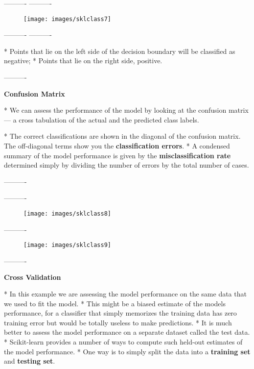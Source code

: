 ----------%
\newpage
----------%
\begin{figure}[h!]
\centering
\texttt{[image: images/sklclass7]}

\end{figure}

----------%
----------%
	
*   Points that lie on the left side of the decision boundary will be classified as negative; 
*   Points that lie on the right side, positive. 
	

----------%
\newpage

\textbf{Confusion Matrix}

*   We can assess the performance of the model by looking at the confusion matrix — a cross tabulation of the actual and the predicted class labels. 

*   The correct classifications are shown in the diagonal of the confusion matrix. The off-diagonal terms show you the \textbf{classification errors}. 
*   A condensed summary of the model performance is given by the \textbf{misclassification rate} determined simply by dividing the number of errors by the total number of cases.


----------%
\newpage

----------%
\begin{figure}[h!]
\centering
\texttt{[image: images/sklclass8]}

\end{figure}
----------%

\begin{figure}[h!]
\centering
\texttt{[image: images/sklclass9]}

\end{figure}


----------%
\newpage

	\textbf{Cross Validation}

*   In this example we are assessing the model performance on the same data that we used to fit the model. 
*   This might be a biased estimate of the models performance, for a classifier that simply memorizes the training data has zero training error but would be totally useless to make predictions.
*    It is much better to assess the model performance on a separate dataset called the test data.
*    Scikit-learn provides a number of ways to compute such held-out estimates of the model performance. *   One way is to simply split the data into a \textbf{training set} and \textbf{testing set}.

